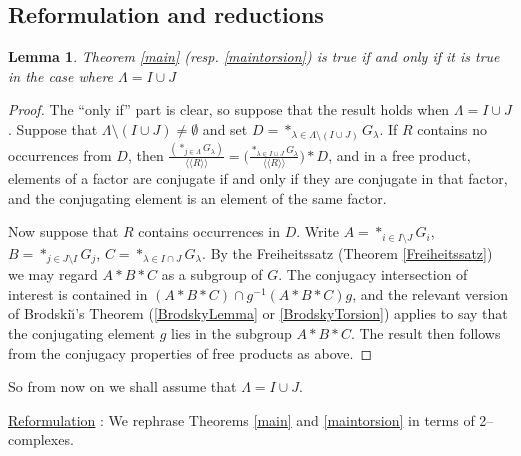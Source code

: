 \documentclass[12pt,a4paper]{amsart}
\def\<{\langle}
\def\>{\rangle}
\newtheorem{lem}[thm]{Lemma}
\begin{document}
\subsection{Reformulation and reductions} \label{refandreds}
 

 
\begin{lem}\label{red1}
Theorem \ref{main} (resp. \ref{maintorsion}) is true if and only if it is true in the case where $\Lambda=I\cup J$
\end{lem} 


\begin{proof}
\noindent  The ``only if'' part is clear, so suppose that the result holds when $\Lambda=I\cup J$.
Suppose that $\Lambda \setminus (I\cup J)\neq \emptyset$ and set $D=\ast_{\lambda\in\Lambda \setminus (I\cup J)} G_\lambda$.
If $R$ contains no occurrences from $D$, then $\frac{(\ast_{j\in \Lambda} G_\lambda)}{\<\<R\>\>} = \bigl(\frac{\ast_{\lambda\in I\cup J} G_\lambda}{\<\<R\>\>}\bigr) *D$, 
and in a free product, 
elements of a factor are  conjugate if
and only if they are conjugate in that factor, and the conjugating element is an element of the same factor.

Now suppose  that  $R$ contains  occurrences in $D$.
Write $A=\ast_{i\in I\setminus J}G_i$, $B=\ast_{j\in J\setminus I}G_j$, $C=\ast_{\lambda\in I\cap J}G_\lambda$.
By the Freiheitssatz (Theorem \ref{Freiheitssatz}) we may regard $A*B*C$ as a subgroup of $G$.  The conjugacy intersection of interest  is contained in $(A*B*C)\cap g^{-1}(A*B*C)g$, and the relevant version of 
Brodski\u\i's Theorem (\ref{BrodskyLemma} or \ref{BrodskyTorsion}) 
applies to say that the conjugating element $g$ lies in the subgroup $A*B*C$. 
The result then follows from the conjugacy properties of free products as above.
\end{proof}

	So from now on we shall assume that $\Lambda = I\cup J$.

\smallskip
\noindent\underline{Reformulation} :	 We rephrase   Theorems \ref{main} and \ref{maintorsion} in terms of 2--complexes.	
\end{document}
